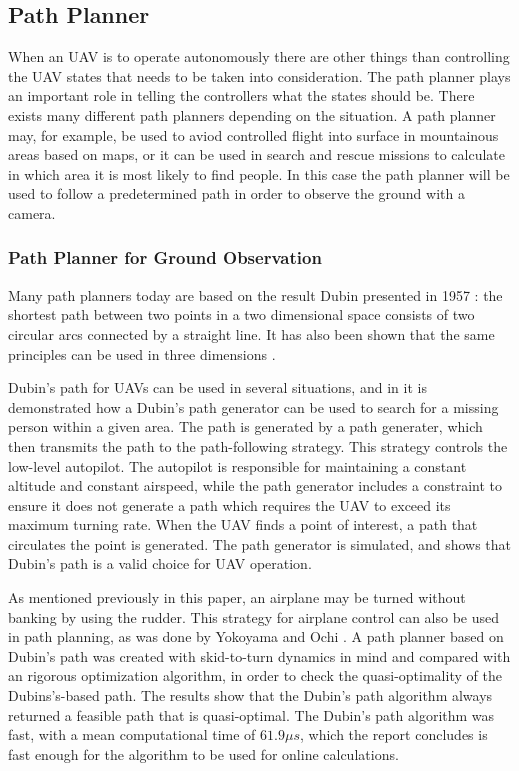 \subsection{Path Planner}
When an UAV is to operate autonomously there are other things than controlling the UAV states that needs to be taken into consideration. The path planner plays an important role in telling the controllers what the states should be. There exists many different path planners depending on the situation. A path planner may, for example, be used to aviod controlled flight into surface in mountainous areas based on maps, or it can be used in search and rescue missions to calculate in which area it is most likely to find people. In this case the path planner will be used to follow a predetermined path in order to observe the ground with a camera.


\subsubsection{Path Planner for Ground Observation}
\label{ch:path_literature}
Many path planners today are based on the result Dubin presented in 1957 \cite{DUBIN}: the shortest path between two points in a two dimensional space consists of two circular arcs connected by a straight line. It has also been shown that the same principles can be used in three dimensions \cite{dubinsBEARD}. 

Dubin's path for UAVs can be used in several situations, and in \cite{dubinFixedWingLUGO} it is demonstrated how a Dubin's path generator can be used to search for a missing person within a given area. The path is generated by a path generater, which then transmits the path to the path-following strategy. This strategy controls the low-level autopilot. The autopilot is responsible for maintaining a constant altitude and constant airspeed, while the path generator includes a constraint to ensure it does not generate a path which requires the UAV to exceed its maximum turning rate. When the UAV finds a point of interest, a path that circulates the point is generated. The path generator is simulated, and shows that Dubin's path is a valid choice for UAV operation.

As mentioned previously in this paper, an airplane may be turned without banking by using the rudder. This strategy for airplane control can also be used in path planning, as was done by Yokoyama and Ochi \cite{skidPathYOKO}. A path planner based on Dubin's path was created with skid-to-turn dynamics in mind and compared with an rigorous optimization algorithm, in order to check the quasi-optimality of the Dubins's-based path. The results show that the Dubin's path algorithm always returned a feasible path that is quasi-optimal. The Dubin's path algorithm was fast, with a mean computational time of $61.9\mu s$, which the report concludes is fast enough for the algorithm to be used for online calculations.
